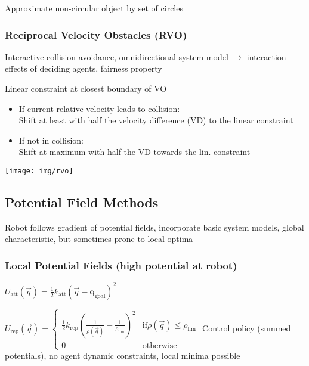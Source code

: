\documentclass[fontsize=6pt]{scrartcl}
\begin{document}
\begin{multicols*}{4}
Approximate non-circular object by set of circles

\subsubsection*{Reciprocal Velocity Obstacles (RVO)}
Interactive collision avoidance, omnidirectional system model $\rightarrow$ interaction effects of deciding agents, fairness property

\begin{minipage}{0.65\linewidth}
Linear constraint at closest boundary of VO

\begin{itemize}
	\item If current relative velocity leads to collision:\\
	Shift at least with half the velocity difference (VD) to the linear constraint
	\item If not in collision:\\
	Shift at maximum with half the VD towards the lin. constraint
\end{itemize}

\end{minipage}
\begin{minipage}{0.32\linewidth}
		\texttt{[image: img/rvo]}
\end{minipage}

\subsection*{Potential Field Methods}

Robot follows gradient of potential fields, incorporate basic system models, global characteristic, but sometimes prone to local optima

\subsubsection*{Local Potential Fields (high potential at robot)}

$
U_\mathrm{att}(\vec q)
=
\frac{1}{2} k_\mathrm{att}(\vec q - \mathbf q_\mathrm{goal})^2$

$
U_\mathrm{rep}(\vec q)
=
\begin{cases}
\frac{1}{2} k_\mathrm{rep} \left(\frac{1}{\rho(\vec q)}
- \frac{1}{\rho_\mathrm{lim}}\right)^2& \mathrm{if } \rho(\vec q) \leq \rho_\mathrm{lim}\\
0 & \mathrm{otherwise}
\end{cases}
$
Control policy (summed potentials), no agent dynamic constraints, local minima possible


\end{multicols*}
\end{document}
